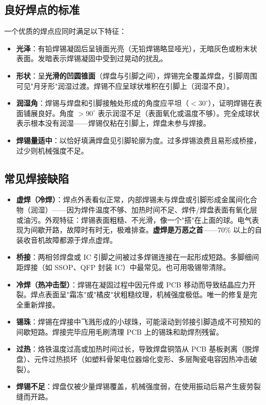 \documentclass[12pt,UTF8]{ctexbook}
\begin{document}
\subsection{良好焊点的标准}

一个优质的焊点应同时满足以下特征：
\begin{itemize}
  \item \textbf{光泽}：有铅焊锡凝固后呈镜面光亮（无铅焊锡略显哑光），无暗灰色或粉末状表面。发暗表示焊锡凝固中受到过晃动的扰乱。
  \item \textbf{形状}：呈\textbf{光滑的凹圆锥面}（焊盘与引脚之间），焊锡完全覆盖焊盘，引脚周围可见"月牙形"润湿过渡。焊锡不应呈球状堆积在引脚上（润湿不良）。
  \item \textbf{润湿角}：焊锡与焊盘和引脚接触处形成的角度应平坦（$<30^\circ$），证明焊锡在表面铺展良好。角度 $>90^\circ$ 表示润湿不足（表面氧化或温度不够）。完全成球状表示根本没有润湿——焊锡仅粘在引脚上，焊盘未参与焊接。
  \item \textbf{焊锡量适中}：以恰好填满焊盘见引脚轮廓为度。过多焊锡浪费且易形成桥接，过少则机械强度不足。
\end{itemize}

\subsection{常见焊接缺陷}

\begin{itemize}
  \item \textbf{虚焊（冷焊）}：焊点外表看似正常，内部焊锡未与焊盘或引脚形成金属间化合物（润湿）——因为焊件温度不够、加热时间不足、焊件/焊盘表面有氧化层或油污。外观特征：焊锡表面粗糙、不光滑，像一个"搭"在上面的球。电气表现为间歇开路，故障时有时无，极难排查。\textbf{虚焊是万恶之首}——70\% 以上的自装收音机故障都源于焊点虚焊。
  \item \textbf{桥接}：两相邻焊盘或 IC 引脚之间被过多焊锡连接在一起形成短路。多脚细间距焊接（如 SSOP、QFP 封装 IC）中最常见。也可用吸锡带清除。
  \item \textbf{冷焊（热冲击型）}：焊锡在凝固过程中因元件或 PCB 移动而导致结晶应力开裂。焊点表面呈"霜冻"或"橘皮"状粗糙纹理，机械强度极低。唯一的修复是完全重新焊接。
  \item \textbf{锡珠}：焊锡在焊接中飞溅形成的小球珠，可能滚动到邻接引脚造成不可预知的间歇短路。焊接完毕应用毛刷清理 PCB 上的锡珠和助焊剂残留。
  \item \textbf{过热}：烙铁温度过高或加热时间过长，导致焊盘铜箔从 PCB 基板剥离（脱焊盘）、元件过热损坏（如塑料骨架电位器熔化变形、多层陶瓷电容因热冲击破裂）。
  \item \textbf{焊锡不足}：焊盘仅被少量焊锡覆盖，机械强度弱，在使用振动后易产生疲劳裂缝而开路。
\end{itemize}
\end{document}
